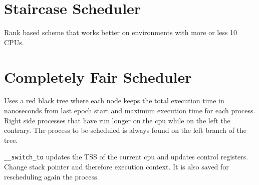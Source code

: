 \documentclass[twoside]{article}
\begin{document}
\section{Staircase Scheduler}
\label{sec:Staircase Scheduler}

Rank based scheme that works better on environments with more or less 10 CPUs.


\section{Completely Fair Scheduler}
\label{sec:Completely Fair Scheduler}

Uses a red black tree where each node keeps the total execution time in
nanoseconds from last epoch start and maximum execution time for each process.
Right side processes
that have run longer on the cpu while on the left the contrary. The process to
be scheduled is always found on the left branch of the tree.

\texttt{__switch_to} updates the TSS of the current cpu and updates control
registers. Change stack pointer and therefore execution context. It is also
saved for rescheduling again the process.


\newpage


\end{document}
